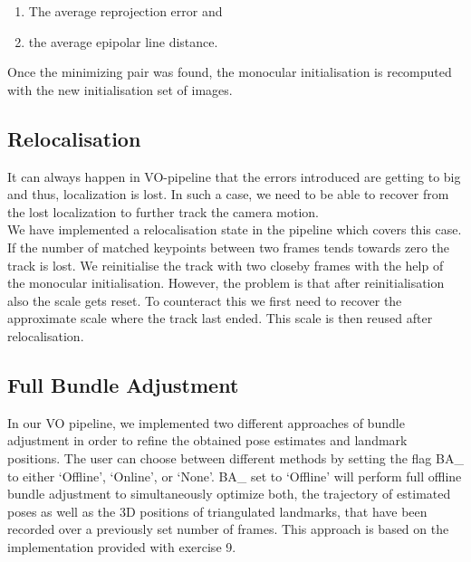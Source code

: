 \begin{enumerate}
\item The average reprojection error and 
\item the average epipolar line distance.
\end{enumerate}

Once the minimizing pair was found, the monocular initialisation is recomputed with the new initialisation set of images.

\subsection{Relocalisation}
It can always happen in VO-pipeline that the errors introduced are getting to big and thus, localization is lost. In such a case, we need to be able to recover from the lost localization to further track the camera motion. \\
We have implemented a relocalisation state in the pipeline which covers this case. If the number of matched keypoints between two frames tends towards zero the track is lost. We reinitialise the track with two closeby frames with the help of the monocular initialisation. However, the problem is that after reinitialisation also the scale gets reset. To counteract this we first need to recover the approximate scale where the track last ended. This scale is then reused after relocalisation. 

\subsection{Full Bundle Adjustment}

In our VO pipeline, we implemented two different approaches of bundle adjustment in order to refine the obtained pose estimates and landmark positions. The user can choose between different methods by setting the flag BA\_ to either ‘Offline’, ‘Online’, or ‘None’. 
BA\_ set to ‘Offline’ will perform full offline bundle adjustment to simultaneously optimize both, the trajectory of estimated poses as well as the 3D positions of triangulated landmarks, that have been recorded over a previously set number of frames. This approach is based on the implementation provided with exercise 9. 

